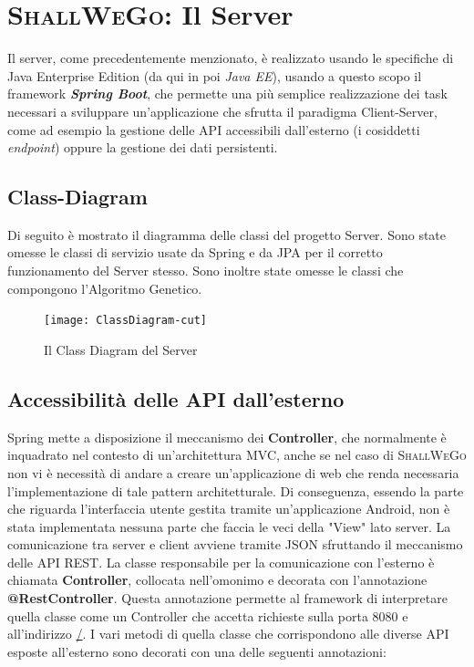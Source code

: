 \section{\textsc{ShallWeGo}: Il Server}
    Il server, come precedentemente menzionato, è realizzato usando le specifiche di Java Enterprise Edition (da qui in poi \textit{Java EE}), usando a questo scopo il framework \textbf{\textit{Spring Boot}}, che permette una più semplice realizzazione dei task necessari a sviluppare un'applicazione che sfrutta il paradigma Client-Server, come ad esempio la gestione delle API accessibili dall'esterno (i cosiddetti \textit{endpoint}) oppure la gestione dei dati persistenti.

    \subsection{Class-Diagram}
        Di seguito è mostrato il diagramma delle classi del progetto Server. Sono state omesse le classi di servizio usate da Spring e da JPA per il corretto funzionamento del Server stesso. Sono inoltre state omesse le classi che compongono l'Algoritmo Genetico.

        \begin{figure}[H]
            \texttt{[image: ClassDiagram-cut]}
            \caption{Il Class Diagram del Server}
            \label{fig: Il Class Diagram del Server}
        \end{figure}

    \subsection{Accessibilità delle API dall'esterno}
        Spring mette a disposizione il meccanismo dei \textbf{Controller}, che normalmente è inquadrato nel contesto di un'architettura MVC, anche se nel caso di \textsc{ShallWeGo} non vi è necessità di andare a creare un'applicazione di web che renda necessaria l'implementazione di tale pattern architetturale. Di conseguenza, essendo la parte che riguarda l'interfaccia utente gestita tramite un'applicazione Android, non è stata implementata nessuna parte che faccia le veci della "View" lato server. La comunicazione tra server e client avviene tramite JSON sfruttando il meccanismo delle API REST. La classe responsabile per la comunicazione con l'esterno è chiamata \textbf{Controller}, collocata nell'omonimo e decorata con l'annotazione \textbf{@RestController}. Questa annotazione permette al framework di interpretare quella classe come un Controller che accetta richieste sulla porta 8080 e all'indirizzo \url{/}. I vari metodi di quella classe che corrispondono alle diverse API esposte all'esterno sono decorati con una delle seguenti annotazioni:

